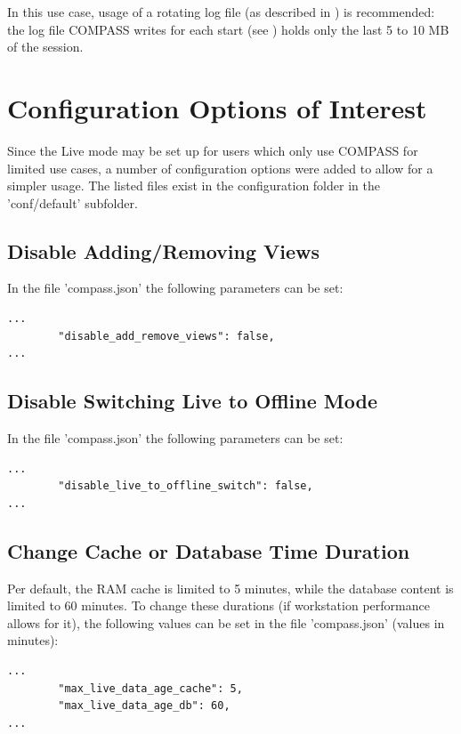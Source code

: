 In this use case, usage of a rotating log file (as described in ) is recommended: the log file COMPASS writes for each start (see ) holds only the last 5 to 10 MB of the session.

\section{Configuration Options of Interest}

Since the Live mode may be set up for users which only use COMPASS for limited use cases, a number of configuration options were added to allow for a simpler usage. The listed files exist in the configuration folder in the 'conf/default' subfolder.

\subsection{Disable Adding/Removing Views}

In the file 'compass.json' the following parameters can be set:

\begin{lstlisting}
...
        "disable_add_remove_views": false,
...        
\end{lstlisting}

\subsection{Disable Switching Live to Offline Mode}

In the file 'compass.json' the following parameters can be set:

\begin{lstlisting}
...
        "disable_live_to_offline_switch": false,
...        
\end{lstlisting}

\subsection{Change Cache or Database Time Duration}

Per default, the RAM cache is limited to 5 minutes, while the database content is limited to 60 minutes. To change these durations (if workstation performance allows for it), the following values can be set in the file 'compass.json' (values in minutes):

\begin{lstlisting}
...
        "max_live_data_age_cache": 5,
        "max_live_data_age_db": 60,
...        
\end{lstlisting}

